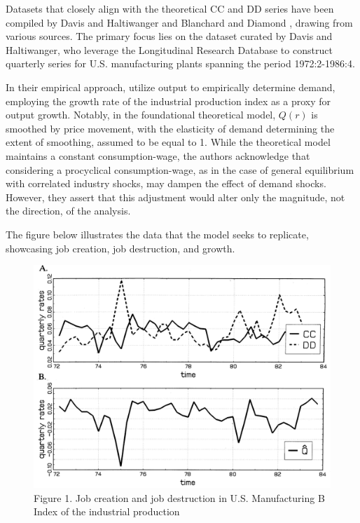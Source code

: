 \documentclass[12pt]{article}
\begin{document}
Datasets that closely align with the theoretical CC and DD series have been compiled by Davis and Haltiwanger
\cite{DAvHalt90,DavHalt92} and Blanchard and Diamond \cite{BlaDia90}, drawing from various sources. The primary focus
lies on the dataset curated by Davis and Haltiwanger, who leverage the Longitudinal Research Database to construct
quarterly series for U.S. manufacturing plants spanning the period 1972:2-1986:4. 

In their empirical approach, \cite{DavHal94}utilize output to empirically determine demand, employing the growth
rate of the industrial production index as a proxy for output growth. Notably, in the foundational theoretical model,
\(Q(r)\) is smoothed by price movement, with the elasticity of demand determining the extent of smoothing, assumed to be
equal to 1. While the theoretical model maintains a constant consumption-wage, the authors acknowledge that considering
a procyclical consumption-wage, as in the case of general equilibrium with correlated industry shocks, may dampen the
effect of demand shocks. However, they assert that this adjustment would alter only the magnitude, not the direction, of
the analysis. 

The figure below illustrates the data that the model seeks to replicate, showcasing job creation, job destruction, and growth.

\begin{figure}
    \centering
    \includegraphics[scale = 0.4]{Plot2.2.png}
    \caption{Figure 1. Job creation and job destruction in U.S. Manufacturing B Index of the industrial production}
    \label{plot:2.2}
\end{figure}
\end{document}
